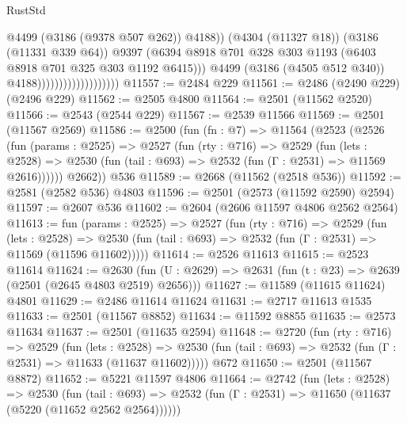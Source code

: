 \begin{lexlean}{RustStd}
\begin{coremodule}
{\begin{coremodule}
{{{{{{{{{{{{{{{{{{{{                                                @4499
                                                (@3186 (@9378 @507 @262))
                                                @4188))
                                            (@4304 (@11327 @18))
                                            (@3186 (@11331 @339 @64))
                                            @9397
                                            (@6394
                                              @8918
                                              @701
                                              @328
                                              @303
                                              @1193
                                              (@6403 @8918 @701 @325 @303 @1192 @6415)))
                                          @4499
                                          (@3186 (@4505 @512 @340))
                                          @4188)))))))))))))))))))
@11557 := @2484 @229
@11561 := @2486 (@2490 @229) (@2496 @229)
@11562 := @2505 @4800
@11564 := @2501 (@11562 @2520)
@11566 := @2543 (@2544 @229)
@11567 := @2539 @11566
@11569 := @2501 (@11567 @2569)
@11586 := @2500
    (fun (fn : @7) =>
    @11564
      (@2523
        (@2526
          (fun (params : @2525) =>
          @2527
            (fun (rty : @716) =>
            @2529
              (fun (lets : @2528) =>
              @2530 (fun (tail : @693) => @2532 (fun (Γ : @2531) => @11569 @2616))))))
        @2662))
    @536
@11589 := @2668 (@11562 (@2518 @536))
@11592 := @2581 (@2582 @536) @4803
@11596 := @2501 (@2573 (@11592 @2590) @2594)
@11597 := @2607 @536
@11602 := @2604 (@2606 @11597 @4806 @2562 @2564)
@11613 := fun (params : @2525) =>
  @2527
    (fun (rty : @716) =>
    @2529
      (fun (lets : @2528) =>
      @2530 (fun (tail : @693) => @2532 (fun (Γ : @2531) => @11569 (@11596 @11602)))))
@11614 := @2526 @11613
@11615 := @2523 @11614
@11624 := @2630
    (fun (U : @2629) => @2631 (fun (t : @23) => @2639 (@2501 (@2645 @4803 @2519) @2656)))
@11627 := @11589 (@11615 @11624) @4801
@11629 := @2486 @11614 @11624
@11631 := @2717 @11613 @1535
@11633 := @2501 (@11567 @8852)
@11634 := @11592 @8855
@11635 := @2573 @11634
@11637 := @2501 (@11635 @2594)
@11648 := @2720
    (fun (rty : @716) =>
    @2529
      (fun (lets : @2528) =>
      @2530 (fun (tail : @693) => @2532 (fun (Γ : @2531) => @11633 (@11637 @11602)))))
    @672
@11650 := @2501 (@11567 @8872)
@11652 := @5221 @11597 @4806
@11664 := @2742
    (fun (lets : @2528) =>
    @2530
      (fun (tail : @693) =>
      @2532 (fun (Γ : @2531) => @11650 (@11637 (@5220 (@11652 @2562 @2564))))))
}}}}}}}}}}}}}}}}}}}}
\end{coremodule}}
\end{coremodule}
\end{lexlean}
